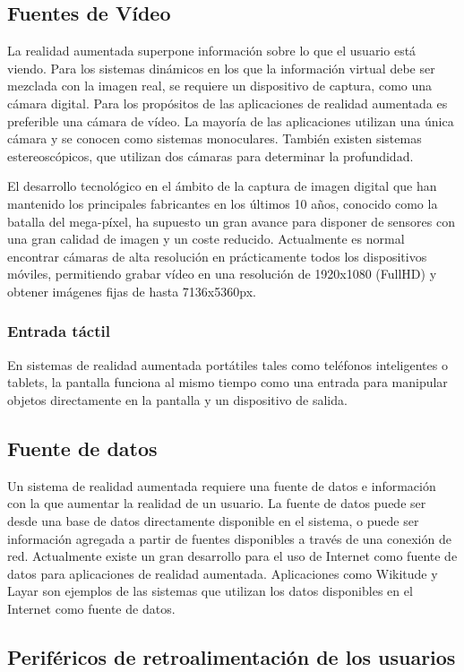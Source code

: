 \subsection{Fuentes de Vídeo}
La realidad aumentada superpone información sobre lo que el usuario está viendo. Para los sistemas dinámicos en los que la información virtual debe ser mezclada con la imagen real, se requiere un dispositivo de captura, como una cámara digital. Para los propósitos de las aplicaciones de realidad aumentada es preferible una cámara de vídeo. La mayoría de las aplicaciones utilizan una única cámara y se conocen como sistemas monoculares. También existen sistemas estereoscópicos, que  utilizan dos cámaras para determinar la profundidad.

El desarrollo tecnológico en el ámbito de la captura de imagen digital que han mantenido los principales fabricantes en los últimos 10 años, conocido como la batalla del mega-píxel, ha supuesto un gran avance para disponer de sensores con una gran calidad de imagen y un coste reducido. Actualmente es normal encontrar cámaras de alta resolución en prácticamente todos los dispositivos móviles, permitiendo grabar vídeo en una resolución de 1920x1080 (FullHD) y obtener imágenes fijas de hasta 7136x5360px.

\subsubsection{Entrada táctil}
En sistemas de realidad aumentada portátiles tales como teléfonos inteligentes o tablets, la pantalla funciona al mismo tiempo como una entrada para manipular objetos directamente en la pantalla y un dispositivo de salida.

\subsection{Fuente de datos}
Un sistema de realidad aumentada requiere una fuente de datos e información con la que aumentar la realidad de un usuario. La fuente de datos puede ser desde una base de datos directamente disponible en el sistema, o puede ser información agregada a partir de fuentes disponibles a través de una conexión de red. Actualmente existe un gran desarrollo para el uso de Internet como fuente de datos para aplicaciones de realidad aumentada. Aplicaciones como Wikitude y Layar son ejemplos de las sistemas que utilizan los datos disponibles en el Internet como fuente de datos.

\subsection{Periféricos de retroalimentación de los usuarios}
